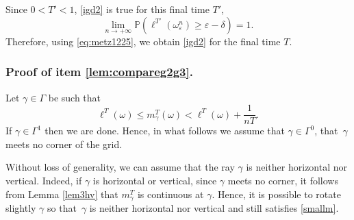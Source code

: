 \documentclass[10pt]{amsart}
\theoremstyle{definition}
\begin{document}
Since $0<T'<1$, \eqref{igd2} is true for this final time $T'$, \ie
\[
\displaystyle\lim_{n\to +\infty} \mathbb{P}\left( \ell^{T'}(\omega_\varepsilon^n) \geq \varepsilon - \delta \right) = 1.
\]
Therefore, using \eqref{eq:metz1225}, we obtain \eqref{igd2} for the final time $T$.


\subsubsection*{Proof of item \eqref{lem:compareg2g3}.}
Let $\gamma\in\Gamma$ be such that
\begin{equation} \label{smallm}
\ell^T(\omega)\leq m^T_\gamma(\omega) < \ell^T(\omega) + \frac{1}{nT}.
\end{equation}
If $\gamma\in\Gamma^1$ then we are done. Hence, in what follows we assume that $\gamma\in\Gamma^0$, \ie that~$\gamma$ meets no corner of the grid.

Without loss of generality, we can assume that the ray $\gamma$ is neither horizontal nor vertical. Indeed, if $\gamma$ is horizontal or vertical, since $\gamma$ meets no corner, it follows from Lemma \ref{lem3hv} that $m^T_\gamma$ is continuous at $\gamma$. Hence, it is possible to rotate slightly $\gamma$ so that~$\gamma$ is neither horizontal nor vertical and still satisfies \eqref{smallm}.
\end{document}
